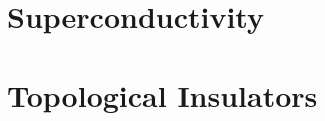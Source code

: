 \documentclass[mathserif]{beamer}
\begin{document}
	\color{white}
	
	
	
	
	
	\section{Superconductivity}
	
	
	
	\section{Topological Insulators}
	
	
	
	
\end{document}
